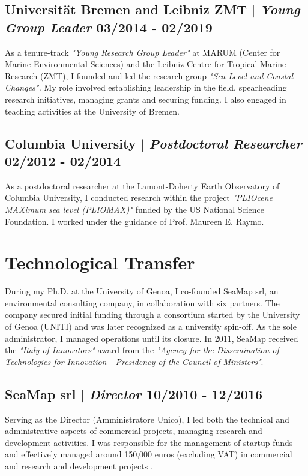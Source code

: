 \documentclass[11pt]{article}
\begin{document}
\subsection{Universität Bremen and Leibniz ZMT $|$ {\normalfont\textit{Young Group Leader}} \hfill 03/2014 - 02/2019}
{\footnotesize As a tenure-track \textit{"Young Research Group Leader"} at MARUM (Center for Marine Environmental Sciences) and the Leibniz Centre for Tropical Marine Research (ZMT), I founded and led the research group \textit{"Sea Level and Coastal Changes".} My role involved establishing leadership in the field, spearheading research initiatives, managing grants and securing funding. I also engaged in teaching activities at the University of Bremen.}
\bigskip

\subsection{Columbia University $|$ {\normalfont\textit{Postdoctoral Researcher}} \hfill 02/2012 - 02/2014}
{\footnotesize As a postdoctoral researcher at the Lamont-Doherty Earth Observatory of Columbia University, I conducted research within the project \textit{"PLIOcene MAXimum sea level (PLIOMAX)"} funded by the US National Science Foundation. I worked under the guidance of Prof. Maureen E. Raymo.}
\bigskip

\section{Technological Transfer}
{\normalfont During my Ph.D. at the University of Genoa, I co-founded SeaMap srl, an environmental consulting company, in collaboration with six partners. The company secured initial funding through a consortium started by the University of Genoa (UNITI) and was later recognized as a university spin-off. As the sole administrator, I managed operations until its closure. In 2011, SeaMap received the \textit{"Italy of Innovators"} award from the \textit{"Agency for the Dissemination of Technologies for Innovation - Presidency of the Council of Ministers"}.}\\
\bigskip

\subsection{SeaMap srl $|$ {\normalfont\textit{Director}} \hfill 10/2010 - 12/2016}
{\footnotesize Serving as the Director (Amministratore Unico), I led both the technical and administrative aspects of commercial projects, managing research and development activities. I was responsible for the management of startup funds and effectively managed around 150,000 euros (excluding VAT) in commercial and research and development projects .}
\end{document}
